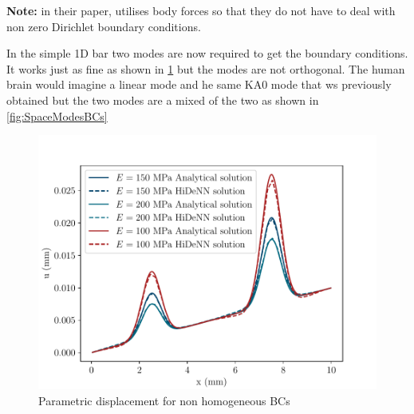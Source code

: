 \textbf{\textcolor{accentcolor}{Note:}} in their paper, \cite{zhang_hidenn-td_2022} utilises body forces so that they do not have to deal with non zero Dirichlet boundary conditions.

In the simple 1D bar two modes are now required to get the boundary conditions. It works just as fine as shown in \ref{fig:BCsDispl_para} but the modes are not orthogonal.
The human brain would imagine a linear mode and he same KA0 mode that ws previously obtained but the two modes are a mixed of the two as shown in \cref{fig:SpaceModesBCs}

\begin{figure}
    \centering
    \includegraphics[width=0.7\linewidth]{Figures/Para_displacementsROM_1Para_np_50_order_1_nmodes_1_npara_1BCs.pdf}
    \caption{Parametric displacement for non homogeneous BCs}
    \label{fig:BCsDispl_para}
\end{figure}

